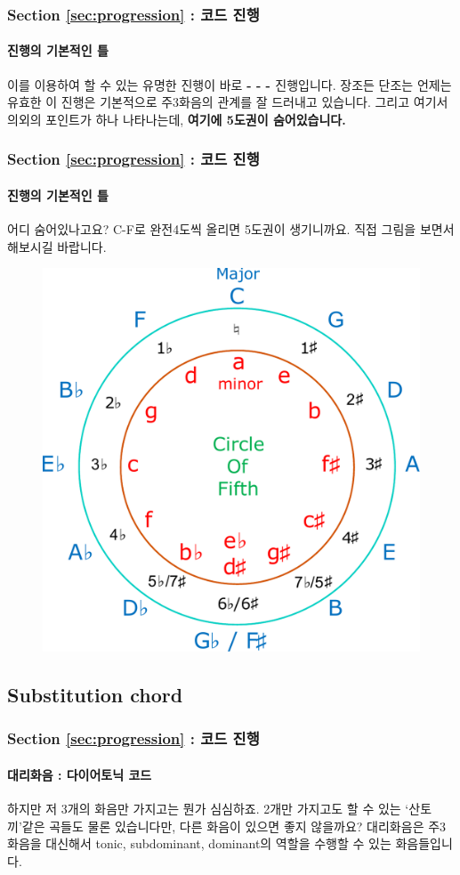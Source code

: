\documentclass{beamer}
\newcommand{\Rn}[1]{%
	\textup{\uppercase\expandafter{\romannumeral#1}}%
}
\begin{document}
	\begin{frame}
		\frametitle{Section \ref{sec:progression} : 코드 진행}
		\framesubtitle{진행의 기본적인 틀}
		이를 이용하여 할 수 있는 유명한 진행이 바로 {\bf \Rn{1}-\Rn{4}-\Rn{5}-\Rn{1}} 진행입니다. 장조든 단조는 언제는 유효한 이 진행은 기본적으로 주3화음의 관계를 잘 드러내고 있습니다. 그리고 여기서 의외의 포인트가 하나 나타나는데, {\bf 여기에 5도권이 숨어있습니다.}
	\end{frame}
	
	\begin{frame}
		\frametitle{Section \ref{sec:progression} : 코드 진행}
		\framesubtitle{진행의 기본적인 틀}
		어디 숨어있나고요? C-F로 완전4도씩 올리면 5도권이 생기니까요. 직접 그림을 보면서 해보시길 바랍니다.
		\begin{figure}
			\centering
			\includegraphics[height=0.6\textheight]{res/pdf/8/circle_of_fifth.pdf}
		\end{figure}
	\end{frame}
	
	\subsection{Substitution chord}
	\begin{frame}
		\frametitle{Section \ref{sec:progression} : 코드 진행}
		\framesubtitle{대리화음 : 다이어토닉 코드}
		하지만 저 3개의 화음만 가지고는 뭔가 심심하죠. 2개만 가지고도 할 수 있는 `산토끼'같은 곡들도 물론 있습니다만, 다른 화음이 있으면 좋지 않을까요? 대리화음은 주3화음을 대신해서 tonic, subdominant, dominant의 역할을 수행할 수 있는 화음들입니다.
	\end{frame}
	
\end{document}
